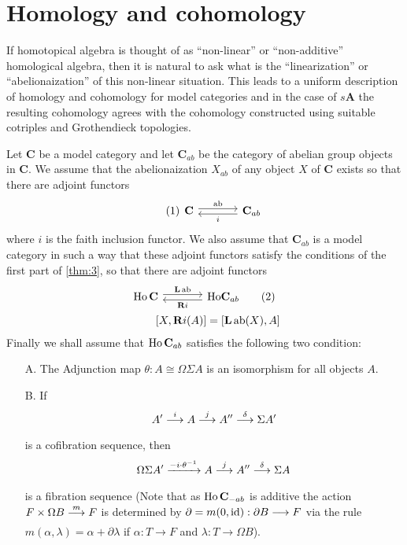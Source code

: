 \documentclass[../main]{subfiles}
\begin{document}
\section{Homology and cohomology}\label{sec:2.5}

If homotopical algebra is thought of as ``non-linear'' or ``non-additive'' homological algebra, then it is natural to ask what is the ``linearization'' or ``abelionaization'' of this non-linear situation. This leads to a uniform description of homology and cohomology for model categories and in the case of $s \mathbf A$ the resulting cohomology agrees with the cohomology constructed using suitable cotriples and Grothendieck topologies.


Let $\mathbf C$ be a model category and let $\mathbf C_{ab}$ be the category of abelian group objects in $\mathbf C$. We assume that the abelionaization $X_{ab}$ of any object $X$ of $\mathbf C$ exists so that there are adjoint functors
\begin{equation}\tag{1}\label{eqn:2.4.1}
  \begin{tikzcd}[column sep=large] 
    \mathbf C \rar["\ab", shift left] & \lar["i", shift left] \mathbf C_{ab} 
  \end{tikzcd}
\end{equation}
where $i$ is the faith inclusion functor. We also assume that $\mathbf C_{ab}$ is a model category in such a way that these adjoint functors satisfy the conditions of the first part of \ref{thm:3}, so that there are adjoint functors 
\begin{align} 
  \begin{tikzcd}[column sep=large, ampersand replacement=\&] \label{eqn:2.4.2}
   \Ho \mathbf C \rar["\mathbf L \ab", shift left] \& \lar["\mathbf R i", shift left] \mathbf \Ho  \mathbf C_{ab} \tag{2}
  \end{tikzcd} \\
[X, \mathbf Ri(A)] = [\mathbf L \ab(X), A]  \notag
\end{align}
Finally we shall assume that $\operatorname{Ho} \mathbf C_{ab}$ satisfies the following two condition:

\begin{enumerate} 
  \item [A.] The Adjunction map $\theta\colon A  \cong \Omega \Sigma A $ is an isomorphism for all objects $A$.
  
  \item [B.] If \[A' \varrightarrow{i} A \varrightarrow{j} A'' \varrightarrow{\delta} \Sigma A'\] is a cofibration sequence, then
  \[\Omega\Sigma A' \varrightarrow{-i \cdot \theta^{-1}} A \varrightarrow{j} A'' \varrightarrow{\delta} \Sigma A\]
  is a fibration sequence (Note that as $\operatorname{Ho} \mathbf C_{-ab}$ is additive the action\\ $F\times \Omega B \varrightarrow{m}F$ is determined by $\partial = m(0, \operatorname{id} ): \partial B \longrightarrow  F$ via the rule \\$m(\alpha, \lambda) = \alpha + \partial\lambda$ if $\alpha: T \longrightarrow  F$ and $\lambda:T \longrightarrow  \Omega B$). 
\end{enumerate}
\end{document}
